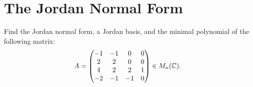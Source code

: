 \documentclass[11pt, a4paper]{article}
\begin{document}
\newpage

\section{The Jordan Normal Form}

\begin{exercise}
  Find the Jordan normal form, a Jordan basis, and the minimal
  polynomial of the following matrix:
  \[ A = 
  \begin{pmatrix}
    -1 & -1 & 0 & 0 \\
    2 & 2 & 0 & 0 \\
    4 & 2 & 2 & 1 \\
    -2 & -1 & -1 & 0 \\
    \end{pmatrix}\in M_n(\mathbb{C}).
  \]
\end{exercise}
\end{document}
